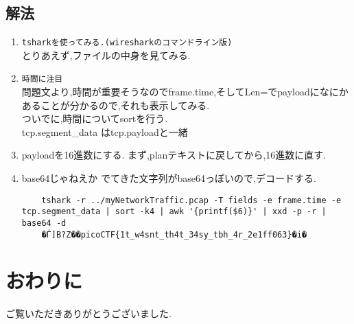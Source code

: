 \documentclass[dvipdfmx]{jsarticle}
\begin{document}
\subsection{解法}
\begin{enumerate}
	\item \texttt{tsharkを使ってみる.(wiresharkのコマンドライン版)}\\
	とりあえず,ファイルの中身を見てみる.
	
	\item \texttt{時間に注目}\\
	問題文より,時間が重要そうなのでframe.time,そしてLen=でpayloadになにかあることが分かるので,それも表示してみる.\\
	ついでに,時間についてsortを行う.\\
	tcp.segment\_data はtcp.payloadと一緒
	
	\item payloadを16進数にする.
	まず,planテキストに戻してから,16進数に直す.
	
	\item base64じゃねえか
	でてきた文字列がbase64っぽいので,デコードする.
	\begin{verbatim}
	tshark -r ../myNetworkTraffic.pcap -T fields -e frame.time -e tcp.segment_data | sort -k4 | awk '{printf($6)}' | xxd -p -r | base64 -d
	�Ѓ]B?Z��picoCTF{1t_w4snt_th4t_34sy_tbh_4r_2e1ff063}�i�	
	\end{verbatim}
\end{enumerate}
\section{おわりに}
ご覧いただきありがとうございました.
\end{document}
